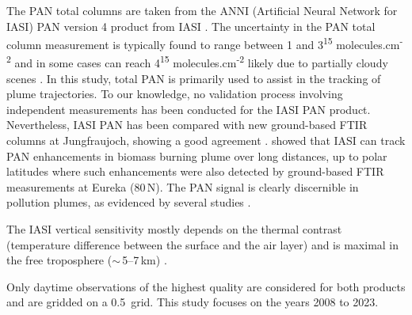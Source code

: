 \documentclass[acp, manuscript]{copernicus}
\begin{document}
The PAN total columns are taken from the ANNI (Artificial Neural Network for IASI) PAN version 4 product from IASI \citep{francoGeneralFrameworkGlobal2018a,clarisseIASINH3Version2023b}. The uncertainty in the PAN total column measurement is typically found to range between 1 and 3\textsuperscript{15} molecules.cm\textsuperscript{-2} and in some cases can reach 4\textsuperscript{15} molecules.cm\textsuperscript{-2} likely due to partially cloudy scenes \citep{francoGeneralFrameworkGlobal2018a}.
In this study, total PAN is primarily used to assist in the tracking of plume trajectories. 
To our knowledge, no validation process involving independent measurements has been conducted for the IASI PAN product. Nevertheless, IASI PAN has been compared with new ground-based FTIR columns at Jungfraujoch, showing a good agreement \citep{mahieuFirstRetrievalsPeroxyacetyl2021}. \citet{wizenbergExceptionalWildfireEnhancements2023} showed that IASI can track PAN enhancements in biomass burning plume over long distances, up to polar latitudes where such enhancements were also detected by ground-based FTIR measurements at Eureka (80\,\textdegree N). The PAN signal is clearly discernible in pollution plumes, as evidenced by several studies \citep[e.g.][]{coheurIASIMeasurementsReactive2009,clarisseIntercontinentalTransportAnthropogenic2011,francoGeneralFrameworkGlobal2018a,zhaiTranspacificTransportAsian2024}.



The IASI vertical sensitivity mostly depends on the thermal contrast (temperature difference between the surface and the air layer) and is maximal in the free troposphere ($\sim$\,5--7\,km) \citep{digioacchinoSpatialTemporalVariations2024}. 


Only daytime observations of the highest quality are considered for both products and are gridded on a 0.5\textdegree {}\textdegree\ grid. This study focuses on the years 2008 to 2023. \\
\end{document}
